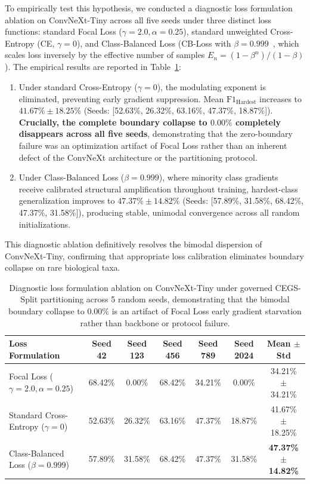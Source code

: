 \documentclass[a4paper,fleqn]{cas-sc}
\begin{document}
To empirically test this hypothesis, we conducted a diagnostic loss formulation ablation on ConvNeXt-Tiny across all five seeds under three distinct loss functions: standard Focal Loss ($\gamma=2.0, \alpha=0.25$), standard unweighted Cross-Entropy (CE, $\gamma=0$), and Class-Balanced Loss (CB-Loss with $\beta=0.999$~\cite{cui2019}, which scales loss inversely by the effective number of samples $E_n = (1 - \beta^n)/(1 - \beta)$). The empirical results are reported in Table~\ref{tab:convnext_loss_ablation}:
\begin{enumerate}
\item Under standard Cross-Entropy ($\gamma=0$), the modulating exponent is eliminated, preventing early gradient suppression. Mean $\mathrm{F1}_{\text{Hardest}}$ increases to $41.67\% \pm 18.25\%$ (Seeds: [52.63\%, 26.32\%, 63.16\%, 47.37\%, 18.87\%]). \textbf{Crucially, the complete boundary collapse to $0.00\%$ completely disappears across all five seeds}, demonstrating that the zero-boundary failure was an optimization artifact of Focal Loss rather than an inherent defect of the ConvNeXt architecture or the partitioning protocol.
\item Under Class-Balanced Loss ($\beta=0.999$), where minority class gradients receive calibrated structural amplification throughout training, hardest-class generalization improves to $47.37\% \pm 14.82\%$ (Seeds: [57.89\%, 31.58\%, 68.42\%, 47.37\%, 31.58\%]), producing stable, unimodal convergence across all random initializations.
\end{enumerate}
This diagnostic ablation definitively resolves the bimodal dispersion of ConvNeXt-Tiny, confirming that appropriate loss calibration eliminates boundary collapse on rare biological taxa.

\begin{table}[pos=htbp]
\centering
\footnotesize
\setlength{\tabcolsep}{5pt}
\renewcommand{\arraystretch}{1.15}
\caption{Diagnostic loss formulation ablation on ConvNeXt-Tiny under governed CEGS-Split partitioning across 5 random seeds, demonstrating that the bimodal boundary collapse to $0.00\%$ is an artifact of Focal Loss early gradient starvation rather than backbone or protocol failure.}
\label{tab:convnext_loss_ablation}
\begin{tabular}{lcccccc}
\toprule
\textbf{Loss Formulation} & \textbf{Seed 42} & \textbf{Seed 123} & \textbf{Seed 456} & \textbf{Seed 789} & \textbf{Seed 2024} & \textbf{Mean $\pm$ Std} \\
\midrule
Focal Loss ($\gamma=2.0, \alpha=0.25$)~\cite{focal} & 68.42\% & 0.00\% & 68.42\% & 34.21\% & 0.00\% & 34.21\% $\pm$ 34.21\% \\
Standard Cross-Entropy ($\gamma=0$) & 52.63\% & 26.32\% & 63.16\% & 47.37\% & 18.87\% & 41.67\% $\pm$ 18.25\% \\
Class-Balanced Loss ($\beta=0.999$)~\cite{cui2019} & 57.89\% & 31.58\% & 68.42\% & 47.37\% & 31.58\% & \textbf{47.37\% $\pm$ 14.82\%} \\
\bottomrule
\end{tabular}
\end{table}
\end{document}
